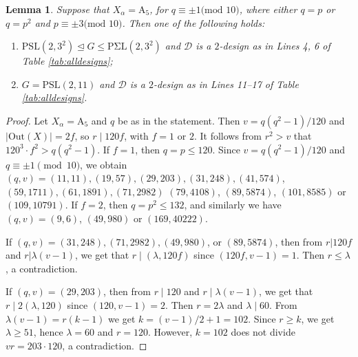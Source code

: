 \documentclass[a4paper,twopage,reqno,12pt]{amsart}
\newtheorem{lemma}[theorem]{Lemma}
\theoremstyle{definition}
\numberwithin{equation}{section}
\newcommand{\PSL}{\mathrm{PSL}}
\newcommand{\PSiL}{\mathrm{P \Sigma L}}
\newcommand{\Out}{\mathrm{Out}}
\renewcommand{\leq}{\leqslant}
\begin{document}
\begin{lemma}\label{case6}
Suppose that $X_{\alpha}=\mathrm{A_5}$, for $q\equiv \pm 1\text{(mod 10)}$, where either $q=p$ or $q=p^2$ and $p\equiv \pm 3\text{(mod 10)}$. Then one of the following holds:
\begin{enumerate}
    \item  $\PSL(2,3^{2})\unlhd G \leq \PSiL(2,3^{2})$ and $\mathcal{D}$ is a $2$-design as in Lines 4, 6 of Table \ref{tab:alldesigns};
    \item $G=\PSL(2,11)$ and $\mathcal{D}$ is a $2$-design as in Lines 11--17 of Table \ref{tab:alldesigns}.
\end{enumerate}
\end{lemma}
\begin{proof} 
Let $X_{\alpha}=\mathrm{A_5}$ and $q$ be as in the statement.
Then $v=q(q^2-1)/120$ and $\left\vert \Out(X)\right\vert =2f$, so $r\mid 120f$, with $f=1$ or $2$.
It follows from $r^2> v$ that 
$ 120^3\cdot f^2>q(q^2-1)$.
If $f=1$, then $q=p\le 120$.
Since $v=q(q^2-1)/120$ and $q \equiv \pm 1 \pmod{10}$, 
we obtain $(q, v)=(11, 11), (19, 57), (29, 203), (31, 248), (41, 574)$, 
$(59, 1711), (61, 1891), (71, 2982)$ $(79, 4108)$, $(89,5874)$, $(101,8585)$ or $(109,10791)$. 
If $f=2$, then $q=p^2\le 132$, and similarly we have 
$(q,v)=(9, 6)$, $(49, 980)$ or $(169,40222)$.



If $(q,v)=(31,248),(71,2982),(49,980)$, or $(89,5874)$, then from $r|120f$ and $r|\lambda(v-1)$, we get that $r\mid(\lambda,120f)$ since $(120f,v-1)=1$. Then $r\le \lambda$, a contradiction. 

If $(q,v)=(29,203)$, then from $r\mid 120$ and $r\mid \lambda(v-1)$, we get that $r\mid 2(\lambda,120)$ since $(120,v-1)=2$. Then $r=2 \lambda$ and $\lambda\mid60$. From $\lambda(v-1)=r(k-1)$ we get $k=(v-1)/2+1=102$. Since $r\ge k$, we get $\lambda\ge 51$, hence $\lambda=60$ and $r=120$. However, $k=102$ does not divide $vr=203\cdot120$, a contradiction. 


\end{proof}
\end{document}
